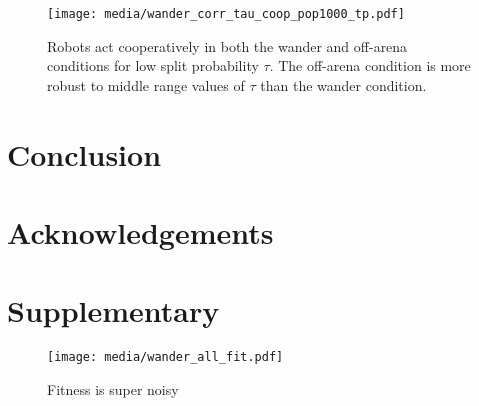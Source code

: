 \documentclass[letterpaper]{article}
\begin{document}
\begin{figure}[tbhp]
    \begin{center}
        \texttt{[image: media/wander\_corr\_tau\_coop\_pop1000\_tp.pdf]}
        \vskip 0.25cm
        \caption{Robots act cooperatively in both the wander and off-arena conditions for low split probability $\tau$. The off-arena condition is more robust to middle range values of $\tau$ than the wander condition.
        }
        \label{fig:comp_tau_wander_tp}
    \end{center}
\end{figure}



\section{Conclusion}



\section{Acknowledgements}



\footnotesize



\clearpage

\section{Supplementary}

\begin{figure}[tbhp]
    \begin{center}
        \texttt{[image: media/wander\_all\_fit.pdf]}
        \vskip 0.25cm
        \caption{Fitness is super noisy
        }
        \label{fig:allfit}
    \end{center}
\end{figure}
\end{document}
